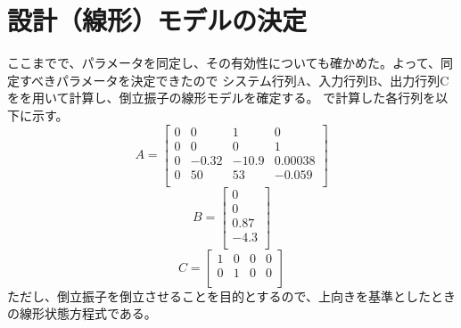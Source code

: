 \section{設計（線形）モデルの決定}
	ここまでで、パラメータを同定し、その有効性についても確かめた。よって、同定すべきパラメータを決定できたので
	システム行列A、入力行列B、出力行列Cを\MaTX{}を用いて計算し、倒立振子の線形モデルを確定する。
	\MaTX{}で計算した各行列を以下に示す。
	\begin{equation}
		A=\left[
		\begin{array}{cccc}
			0 & 0 & 1 & 0 \\
			0 & 0 & 0 & 1 \\
			0 & -0.32 & -10.9 & 0.00038 \\
			0 & 50 & 53 & -0.059 \\
		\end{array}
		\right]
	\end{equation}
	\begin{equation}
		B=\left[
		\begin{array}{c}
			0 \\
			0 \\
			0.87 \\
			-4.3 \\
		\end{array}
		\right]
	\end{equation}
	\begin{equation}
		C=\left[
		\begin{array}{cccc}
			1 & 0 & 0 & 0 \\
			0 & 1 & 0 & 0 \\
		\end{array}
		\right]
	\end{equation}
	ただし、倒立振子を倒立させることを目的とするので、上向きを基準としたときの線形状態方程式である。
